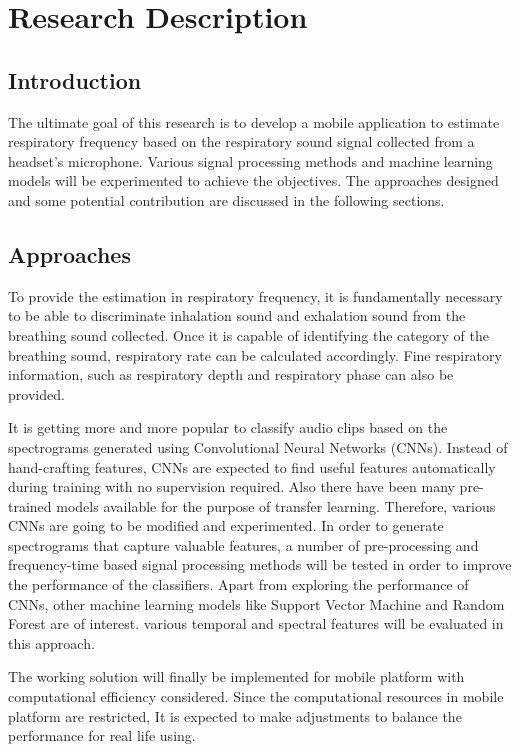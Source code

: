 \chapter{Research Description}
\section{Introduction}
The ultimate goal of this research is to develop a mobile application to estimate respiratory frequency based on the respiratory sound signal collected from a headset's microphone. Various signal processing methods and machine learning models will be experimented to achieve the objectives. The approaches designed and some potential contribution are discussed in the following sections.

\section{Approaches}
To provide the estimation in respiratory frequency, it is fundamentally necessary to be able to discriminate inhalation sound and exhalation sound from the breathing sound collected. Once it is capable of identifying the category of the breathing sound,  respiratory rate can be calculated accordingly. Fine respiratory information, such as respiratory depth and respiratory phase can also be provided.

It is getting more and more popular to classify audio clips based on the spectrograms generated using Convolutional Neural Networks (CNNs). Instead of hand-crafting features, CNNs are expected to find useful features automatically during training with no supervision required. Also there have been many pre-trained models available for the purpose of transfer learning. Therefore, various CNNs are going to be modified and experimented. In order to generate spectrograms that capture valuable features, a number of pre-processing and frequency-time based signal processing methods will be tested in order to improve the performance of the classifiers. Apart from exploring the performance of CNNs, other machine learning models like Support Vector Machine and Random Forest are of interest. various temporal and spectral features will be evaluated in this approach. 

The working solution will finally be implemented for mobile platform with computational efficiency considered. Since the computational resources in mobile platform are restricted, It is expected to make adjustments to balance the performance for real life using.

